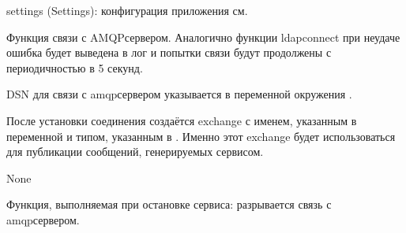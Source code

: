 \documentclass[a4paper,10pt,russian]{sphinxmanual}
\begin{document}
\begin{fulllineitems}
\begin{sphinxVerbatim}[commandchars=\\\{\}]
  
     
         
         
\end{sphinxVerbatim}
\begin{description}
\sphinxAtStartPar
settings (Settings): конфигурация приложения см. 

\end{description}


\begin{fulllineitems}

\pysigstartsignatures
{}
\pysigstopsignatures
\sphinxAtStartPar
Функция связи с AMQP\sphinxhyphen{}сервером.
Аналогично функции ldap\sphinxhyphen{}connect при неудаче ошибка будет выведена в лог
и попытки связи будут продолжены с периодичностью в 5 секунд.

\sphinxAtStartPar
DSN для связи с amqp\sphinxhyphen{}сервером указывается в переменной окружения
.

\sphinxAtStartPar
После установки соединения создаётся exchange с именем, указанным
в переменной  и типом, указанным в .
Именно этот exchange будет использоваться для публикации сообщений,
генерируемых сервисом.
\begin{description}
\sphinxAtStartPar
None

\end{description}

\end{fulllineitems}



\begin{fulllineitems}

\pysigstartsignatures
{}
\pysigstopsignatures
\sphinxAtStartPar
Функция, выполняемая при остановке сервиса: разрывается связь
с amqp\sphinxhyphen{}сервером.


\end{fulllineitems}
\end{fulllineitems}
\end{document}
